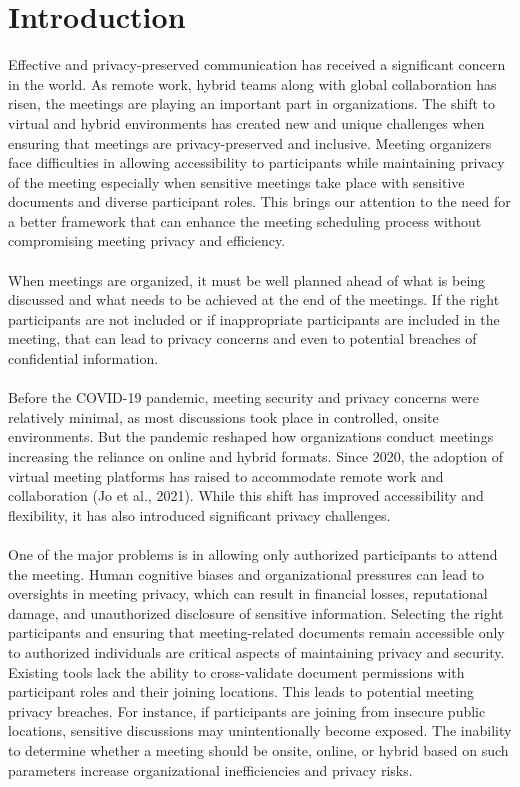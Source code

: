 \section{Introduction}
\noindent
Effective and privacy-preserved communication has received a significant concern in the world. As remote work, hybrid teams along with global collaboration has risen, the meetings are playing an important part in organizations. The shift to virtual and hybrid environments has created new and unique challenges when ensuring that meetings are privacy-preserved and inclusive. Meeting organizers face difficulties in allowing accessibility to participants while maintaining privacy of the meeting especially when sensitive meetings take place with sensitive documents and diverse participant roles. This brings our attention to the need for a better framework that can enhance the meeting scheduling process without compromising meeting privacy and efficiency.\\ \\
When meetings are organized, it must be well planned ahead of what is being discussed and what needs to be achieved at the end of the meetings. If the right participants are not included or if inappropriate participants are included in the meeting, that can lead to privacy concerns and even to potential breaches of confidential information.\\ \\
Before the COVID-19 pandemic, meeting security and privacy concerns were relatively minimal, as most discussions took place in controlled, onsite environments. But the pandemic reshaped how organizations conduct meetings increasing the reliance on online and hybrid formats. Since 2020, the adoption of virtual meeting platforms has raised to accommodate remote work and collaboration (Jo et al., 2021). While this shift has improved accessibility and flexibility, it has also introduced significant privacy challenges.\\ \\
One of the major problems is in allowing only authorized participants to attend the meeting. Human cognitive biases and organizational pressures can lead to oversights in meeting privacy, which can result in financial losses, reputational damage, and unauthorized disclosure of sensitive information. Selecting the right participants and ensuring that meeting-related documents remain accessible only to authorized individuals are critical aspects of maintaining privacy and security. Existing tools lack the ability to cross-validate document permissions with participant roles and their joining locations. This leads to potential meeting privacy breaches. For instance, if participants are joining from insecure public locations, sensitive discussions may unintentionally become exposed. The inability to determine whether a meeting should be onsite, online, or hybrid based on such parameters increase organizational inefficiencies and privacy risks.\\ \\
